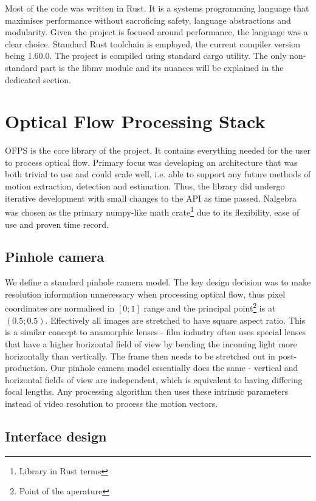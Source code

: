 \documentclass[11pt,english]{report}
\begin{document}
Most of the code was written in Rust. It is a systems programming language that maximises performance without sacroficing safety, language abstractions and modularity. Given the project is focused around performance, the language was a clear choice. Standard Rust toolchain is employed, the current compiler version being 1.60.0. The project is compiled using standard cargo utility. The only non-standard part is the libmv module and its nuances will be explained in the dedicated section.

\section{Optical Flow Processing Stack}

OFPS is the core library of the project. It contains everything needed for the user to process optical flow. Primary focus was developing an architecture that was both trivial to use and could scale well, i.e. able to support any future methods of motion extraction, detection and estimation. Thus, the library did undergo iterative development with small changes to the API as time passed. Nalgebra was chosen as the primary numpy-like math crate\footnote{Library in Rust terms} due to its flexibility, ease of use and proven time record.

\subsection{Pinhole camera}

We define a standard pinhole camera model. The key design decision was to make resolution information unnecessary when processing optical flow, thus pixel coordinates are normalised in $[0; 1]$ range and the principal point\footnote{Point of the aperature} is at $(0.5; 0.5)$. Effectively all images are stretched to have square aspect ratio. This is a similar concept to anamorphic lenses - film industry often uses special lenses that have a higher horizontal field of view by bending the incoming light more horizontally than vertically. The frame then needs to be stretched out in post-production. Our pinhole camera model essentially does the same - vertical and horizontal fields of view are independent, which is equivalent to having differing focal lengths. Any processing algorithm then uses these intrinsic parameters instead of video resolution to process the motion vectors.

\subsection{Interface design}
\end{document}
